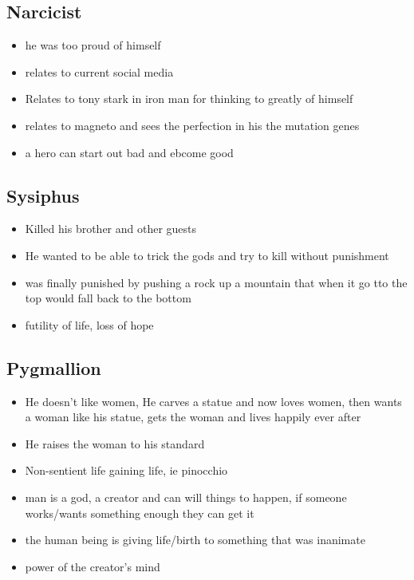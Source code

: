\documentclass[12pt]{article}
\begin{document}
	\subsection*{Narcicist}
	\begin{itemize}
		\item he was too proud of himself
		\item relates to current social media
		\item Relates to tony stark in iron man for thinking to greatly of himself
		\item relates to magneto and sees the perfection in his the mutation genes
		\item a hero can start out bad and ebcome good
	\end{itemize}

	\subsection*{Sysiphus}
	\begin{itemize}
		\item Killed his brother and other guests
		\item He wanted to be able to trick the gods and try to kill without punishment
		\item was finally punished by pushing a rock up a mountain that when it go tto the top would fall back to the bottom
		\item futility of life, loss of hope
	\end{itemize}
	
	\subsection*{Pygmallion}
	\begin{itemize}
		\item He doesn't like women, He carves a statue and now loves women, then wants a woman like his statue, gets the woman and lives happily ever after
		\item He raises the woman to his standard
		\item Non-sentient life gaining life, ie pinocchio
		\item man is a god, a creator and can will things to happen, if someone works/wants something enough they can get it
		\item the human being is giving life/birth to something that was inanimate
		\item power of the creator's mind
	\end{itemize}
\end{document}
